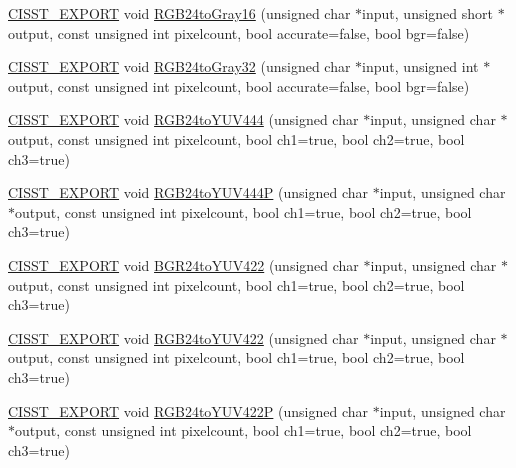 \begin{DoxyCompactItemize}
\item 
\hyperlink{cmn_export_macros_8h_a99393e0c3ac434b2605235bbe20684f8}{C\+I\+S\+S\+T\+\_\+\+E\+X\+P\+O\+R\+T} void \hyperlink{namespacesvl_converter_abf6e775d4d85227bca12d93a28040bd0}{R\+G\+B24to\+Gray16} (unsigned char $\ast$input, unsigned short $\ast$output, const unsigned int pixelcount, bool accurate=false, bool bgr=false)
\item 
\hyperlink{cmn_export_macros_8h_a99393e0c3ac434b2605235bbe20684f8}{C\+I\+S\+S\+T\+\_\+\+E\+X\+P\+O\+R\+T} void \hyperlink{namespacesvl_converter_a6db9feff4a905fa89f7029fe43c2b469}{R\+G\+B24to\+Gray32} (unsigned char $\ast$input, unsigned int $\ast$output, const unsigned int pixelcount, bool accurate=false, bool bgr=false)
\item 
\hyperlink{cmn_export_macros_8h_a99393e0c3ac434b2605235bbe20684f8}{C\+I\+S\+S\+T\+\_\+\+E\+X\+P\+O\+R\+T} void \hyperlink{namespacesvl_converter_a542ef242e36659b60aca4479902d9cc5}{R\+G\+B24to\+Y\+U\+V444} (unsigned char $\ast$input, unsigned char $\ast$output, const unsigned int pixelcount, bool ch1=true, bool ch2=true, bool ch3=true)
\item 
\hyperlink{cmn_export_macros_8h_a99393e0c3ac434b2605235bbe20684f8}{C\+I\+S\+S\+T\+\_\+\+E\+X\+P\+O\+R\+T} void \hyperlink{namespacesvl_converter_a645ff539cbb8bc5af41fbde1ae339c38}{R\+G\+B24to\+Y\+U\+V444\+P} (unsigned char $\ast$input, unsigned char $\ast$output, const unsigned int pixelcount, bool ch1=true, bool ch2=true, bool ch3=true)
\item 
\hyperlink{cmn_export_macros_8h_a99393e0c3ac434b2605235bbe20684f8}{C\+I\+S\+S\+T\+\_\+\+E\+X\+P\+O\+R\+T} void \hyperlink{namespacesvl_converter_a749dd58d1642cb7c3ffd5f395b07cbe1}{B\+G\+R24to\+Y\+U\+V422} (unsigned char $\ast$input, unsigned char $\ast$output, const unsigned int pixelcount, bool ch1=true, bool ch2=true, bool ch3=true)
\item 
\hyperlink{cmn_export_macros_8h_a99393e0c3ac434b2605235bbe20684f8}{C\+I\+S\+S\+T\+\_\+\+E\+X\+P\+O\+R\+T} void \hyperlink{namespacesvl_converter_a075ff677fa0c08ea9a6985c066f5fd6c}{R\+G\+B24to\+Y\+U\+V422} (unsigned char $\ast$input, unsigned char $\ast$output, const unsigned int pixelcount, bool ch1=true, bool ch2=true, bool ch3=true)
\item 
\hyperlink{cmn_export_macros_8h_a99393e0c3ac434b2605235bbe20684f8}{C\+I\+S\+S\+T\+\_\+\+E\+X\+P\+O\+R\+T} void \hyperlink{namespacesvl_converter_a91b8e9ef5654edf30dbef536b7921457}{R\+G\+B24to\+Y\+U\+V422\+P} (unsigned char $\ast$input, unsigned char $\ast$output, const unsigned int pixelcount, bool ch1=true, bool ch2=true, bool ch3=true)

\end{DoxyCompactItemize}

